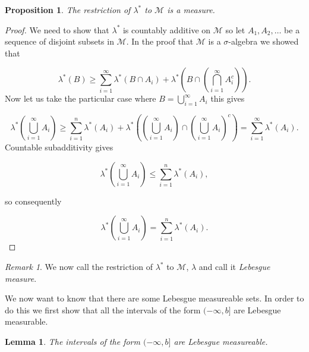\documentclass[
]{book}
\newtheorem{lemma}{Lemma}[chapter]
\newtheorem{proposition}{Proposition}[chapter]
\theoremstyle{definition}
\theoremstyle{definition}
\theoremstyle{definition}
\theoremstyle{definition}
\theoremstyle{remark}
\newtheorem*{remark}{Remark}
\begin{document}
\begin{proposition}
The restriction of \(\lambda^*\) to \(\mathscr{M}\) is a measure.
\end{proposition}

\begin{proof}
We need to show that \(\lambda^*\) is countably additive on \(\mathscr{M}\) so let \(A_1, A_2, \dots\) be a sequence of disjoint subsets in \(\mathscr{M}\). In the proof that \(\mathscr{M}\) is a \(\sigma\)-algebra we showed that

\[ \lambda^*(B) \geq \sum_{i=1}^\infty \lambda^*(B \cap A_i) + \lambda^* \left( B \cap \left( \bigcap_{i=1}^\infty A_i^c \right) \right). \]
Now let us take the particular case where \(B = \bigcup_{i=1}^\infty A_i\) this gives

\[ \lambda^* \left( \bigcup_{i=1}^\infty A_i \right) \geq \sum_{i=1}^n \lambda^*(A_i) + \lambda^* \left(\left( \bigcup_{i=1}^\infty A_i \right) \cap \left( \bigcup_{i=1}^\infty A_i \right)^c \right) = \sum_{i=1}^\infty \lambda^* (A_i). \]
Countable subadditivity gives

\[ \lambda^* \left( \bigcup_{i=1}^\infty A_i \right) \leq \sum_{i=1}^n \lambda^*(A_i),  \]

so consequently

\[ \lambda^* \left( \bigcup_{i=1}^\infty A_i \right) = \sum_{i=1}^n \lambda^*(A_i).  \]
\end{proof}

\begin{remark}
We now call the restriction of \(\lambda^*\) to \(\mathscr{M}\), \(\lambda\) and call it \emph{Lebesgue measure}.
\end{remark}

We now want to know that there are some Lebesgue measureable sets. In order to do this we first show that all the intervals of the form \((-\infty, b]\) are Lebesgue measurable.

\begin{lemma}
The intervals of the form \((-\infty, b]\) are Lebesgue measureable.
\end{lemma}
\end{document}
